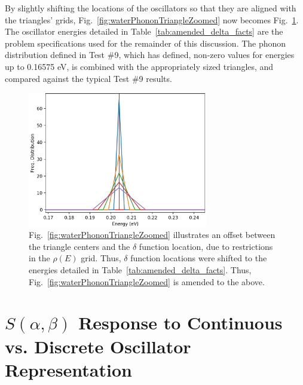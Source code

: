 \documentclass[Master.tex]{subfiles}
\begin{document}
    By slightly shifting the locations of the oscillators so that they are aligned with the triangles' grids, Fig.~\ref{fig:waterPhononTriangleZoomed} now becomes Fig.~\ref{fig:waterPhononTriangleZoomedShifted}. The oscillator energies detailed in Table~\ref{tab:amended_delta_facts} are the problem specifications used for the remainder of this discussion. The phonon distribution defined in Test \#9, which has defined, non-zero values for energies up to 0.16575 eV, is combined with the appropriately sized triangles, and compared against the typical Test \#9 results. 


    \begin{figure}[h]
      \begin{center}
        \includegraphics[width=0.7\textwidth]{alteredDeltaZoomedb}
        \caption[Triangles of various widths, plotted alongside shifted $\delta$ functions]{Fig.~\ref{fig:waterPhononTriangleZoomed} illustrates an offset between the triangle centers and the $\delta$ function location, due to restrictions in the $\rho(E)$ grid. Thus, $\delta$ function locations were shifted to the energies detailed in Table~\ref{tab:amended_delta_facts}. Thus, Fig.~\ref{fig:waterPhononTriangleZoomed} is amended to the above.}
        \label{fig:waterPhononTriangleZoomedShifted}
      \end{center}
    \end{figure}






\section{$S(\alpha,\beta)$ Response to Continuous vs. Discrete Oscillator Representation} 
\end{document}
